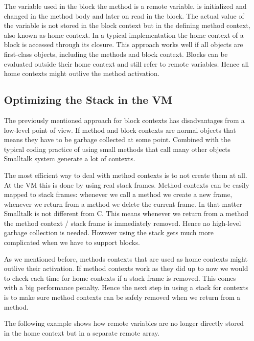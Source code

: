 \documentclass[a4paper,10pt,twoside]{book}
\begin{document}
The  variable used in the block the  method is a remote variable.
 is initialized and changed in the method body and later on read in the block.
The actual value of the variable is not stored in the block context but in the defining method context, also known as home context.
In a typical implementation the home context of a block is accessed through its closure.
This approach works well if all objects are first-class objects, including the methods and block context.
Blocks can be evaluated outside their home context and still refer to remote variables.
Hence all home contexts might outlive the method activation. 

\subsection{Optimizing the Stack in the VM}
The previously mentioned approach for block contexts has disadvantages from a low-level point of view.
If method and block contexts are normal objects that means they have to be garbage collected at some point.
Combined with the typical coding practice of using small methods that call many other objects Smalltalk system generate a lot of contexts.

The most efficient way to deal with method contexts is to not create them at all.
At the VM this is done by using real stack frames.
Method contexts can be easily mapped to stack frames: whenever we call a method we create a new frame, whenever we return from a method we delete the current frame.
In that matter Smalltalk is not different from C.
This means whenever we return from a method the method context / stack frame is immediately removed.
Hence no high-level garbage collection is needed. 
However using the stack gets much more complicated when we have to support blocks.

As we mentioned before, methods contexts that are used as home contexts might outlive their activation.
If method contexts work as they did up to now we would to check each time for home contexts if a stack frame is removed.
This comes with a big performance penalty.
Hence the next step in using a stack for contexts is to make sure method contexts can be safely removed when we return from a method.

The following example shows how remote variables are no longer directly stored in the home context but in a separate remote array.
\end{document}
